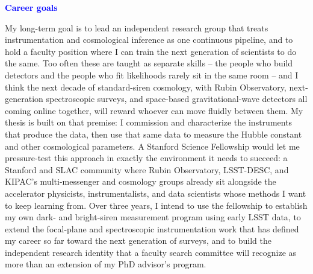 \documentclass[11pt]{article}
\newcommand{\statement}[1]{\par\medskip
  \textcolor{blue}{\textbf{#1}}%
}
\begin{document}
\statement{Career goals}
My long-term goal is to lead an independent research group that treats instrumentation and cosmological inference as one continuous pipeline, and to hold a faculty position where I can train the next generation of scientists to do the same. Too often these are taught as separate skills -- the people who build detectors and the people who fit likelihoods rarely sit in the same room -- and I think the next decade of standard-siren cosmology, with Rubin Observatory, next-generation spectroscopic surveys, and space-based gravitational-wave detectors all coming online together, will reward whoever can move fluidly between them. My thesis is built on that premise: I commission and characterize the instruments that produce the data, then use that same data to measure the Hubble constant and other cosmological parameters. A Stanford Science Fellowship would let me pressure-test this approach in exactly the environment it needs to succeed: a Stanford and SLAC community where Rubin Observatory, LSST-DESC, and KIPAC's multi-messenger and cosmology groups already sit alongside the accelerator physicists, instrumentalists, and data scientists whose methods I want to keep learning from. Over three years, I intend to use the fellowship to establish my own dark- and bright-siren measurement program using early LSST data, to extend the focal-plane and spectroscopic instrumentation work that has defined my career so far toward the next generation of surveys, and to build the independent research identity that a faculty search committee will recognize as more than an extension of my PhD advisor's program.
\end{document}
